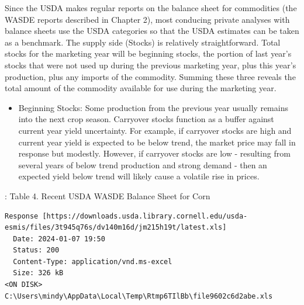 \documentclass[
  letterpaper,
  DIV=11,
  numbers=noendperiod]{scrreprt}
\providecommand{\tightlist}{%
  \setlength{\itemsep}{0pt}\setlength{\parskip}{0pt}}\usepackage{longtable,booktabs,array}
\begin{document}
Since the USDA makes regular reports on the balance sheet for
commodities (the WASDE reports described in Chapter 2), most conducing
private analyses with balance sheets use the USDA categories so that the
USDA estimates can be taken as a benchmark. The supply side (Stocks) is
relatively straightforward. Total stocks for the marketing year will be
beginning stocks, the portion of last year's stocks that were not used
up during the previous marketing year, plus this year's production, plus
any imports of the commodity. Summing these three reveals the total
amount of the commodity available for use during the marketing year.

\begin{itemize}
\tightlist
\item
  Beginning Stocks: Some production from the previous year usually
  remains into the next crop season. Carryover stocks function as a
  buffer against current year yield uncertainty. For example, if
  carryover stocks are high and current year yield is expected to be
  below trend, the market price may fall in response but modestly.
  However, if carryover stocks are low - resulting from several years of
  below trend production and strong demand - then an expected yield
  below trend will likely cause a volatile rise in prices.
\end{itemize}

: Table 4. Recent USDA WASDE Balance Sheet for Corn

\begin{verbatim}
Response [https://downloads.usda.library.cornell.edu/usda-esmis/files/3t945q76s/dv140m16d/jm215h19t/latest.xls]
  Date: 2024-01-07 19:50
  Status: 200
  Content-Type: application/vnd.ms-excel
  Size: 326 kB
<ON DISK>  C:\Users\mindy\AppData\Local\Temp\Rtmp6TIlBb\file9602c6d2abe.xls
\end{verbatim}
\end{document}
